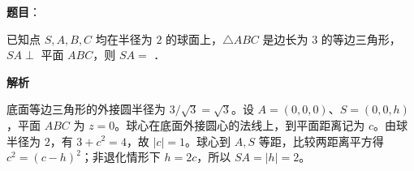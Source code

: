 \begin{answer}

\textbf{题目}：

已知点 $S,A,B,C$ 均在半径为 $2$ 的球面上，$\triangle ABC$ 是边长为 $3$ 的等边三角形，$SA\perp$ 平面 $ABC$，则 $SA=$ \gkblank{}．

\textbf{解析}

底面等边三角形的外接圆半径为 $3/\sqrt3=\sqrt3$。设 $A=(0,0,0)$、$S=(0,0,h)$，平面 $ABC$ 为 $z=0$。球心在底面外接圆心的法线上，到平面距离记为 $c$。由球半径为 $2$，有 $3+c^2=4$，故 $|c|=1$。球心到 $A,S$ 等距，比较两距离平方得 $c^2=(c-h)^2$；非退化情形下 $h=2c$，所以 $SA=|h|=2$。


\end{answer}

